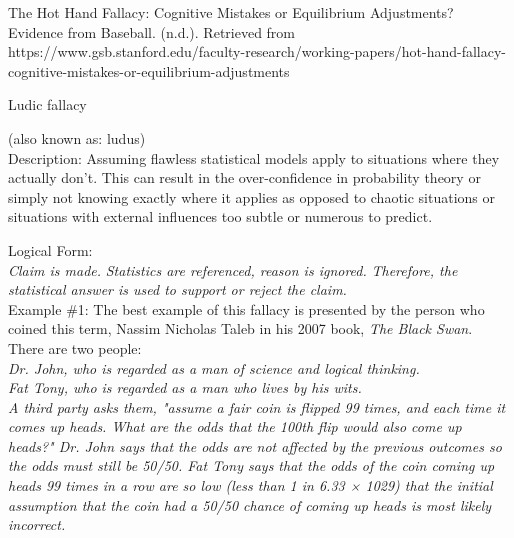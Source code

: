 \documentclass[a4paper,12pt,single,pdftex]{scrartcl}
\begin{document}
      
        
          The Hot Hand Fallacy: Cognitive Mistakes or Equilibrium Adjustments? Evidence from Baseball. (n.d.). Retrieved from https://www.gsb.stanford.edu/faculty-research/working-papers/hot-hand-fallacy-cognitive-mistakes-or-equilibrium-adjustments
        
      
    
  

Ludic fallacy
    
      (also known as: ludus)
    \\

  
    Description: Assuming flawless statistical models apply to situations where they actually don’t.  This can result in the over-confidence in probability theory or simply not knowing exactly where it applies as opposed to chaotic situations or situations with external influences too subtle or numerous to predict.

    
      Logical Form:
    \\

    
      {\em Claim is made.} \newline
{\em Statistics are referenced, reason is ignored.} \newline
{\em Therefore, the statistical answer is used to support or reject the claim.}
    \\

    
      Example \#1: The best example of this fallacy is presented by the person who coined this term, Nassim Nicholas Taleb in his 2007 book, {\it The Black Swan}.  There are two people:
    \\

    
      {\em Dr. John, who is regarded as a man of science and logical thinking.}
    \\

    
      {\em Fat Tony, who is regarded as a man who lives by his wits.}
    \\

    
      {\em A third party asks them, "assume a fair coin is flipped 99 times, and each time it comes up heads. What are the odds that the 100th flip would also come up heads?"  Dr. John says that the odds are not affected by the previous outcomes so the odds must still be 50/50.  Fat Tony says that the odds of the coin coming up heads 99 times in a row are so low (less than 1 in 6.33 × 1029) that the initial assumption that the coin had a 50/50 chance of coming up heads is most likely incorrect.}
    \\
\end{document}
